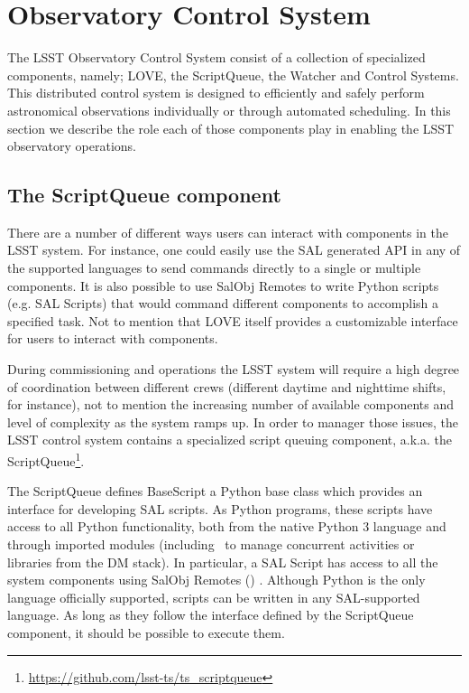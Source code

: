 \section{Observatory Control System}\label{sect:ocs}
The LSST Observatory Control System consist of a collection of specialized components, namely; LOVE, the ScriptQueue, 
the Watcher and Control Systems. This distributed control system is designed to efficiently and safely perform astronomical 
observations individually or through automated scheduling. In this section we describe the role each of those components play 
in enabling the LSST observatory operations. 

\subsection{The ScriptQueue component} \label{sect:scriptq}
There are a number of different ways users can interact with components in the LSST system. For instance, one could easily use the 
SAL generated API in any of the supported languages to send commands directly to a single or multiple components. It is also possible 
to use SalObj Remotes to write Python scripts (e.g. SAL Scripts) that would command different components to accomplish a specified 
task. Not to mention that LOVE itself provides a customizable interface for users to interact with components.

During commissioning and operations the LSST system will require a high degree of coordination between different crews 
(different daytime and nighttime shifts, for instance), not to mention the increasing number of available components and level of 
complexity as the system ramps up. In order to manager those issues, the LSST control system contains a specialized script 
queuing component, a.k.a. the ScriptQueue\footnote{\url{https://github.com/lsst-ts/ts_scriptqueue}}.

The ScriptQueue defines BaseScript a Python base class which provides an interface for developing SAL scripts. 
As Python programs, these scripts have access to all Python functionality, both from the native Python 3 language and through 
imported modules (including \asyncio~to manage concurrent activities or libraries from the DM stack). In particular, a SAL Script 
has access to all the system components using SalObj Remotes () . Although Python is the only language 
officially supported, scripts can be written in any SAL-supported language. As long as they follow the interface defined by the 
ScriptQueue component, it should be possible to execute them.

